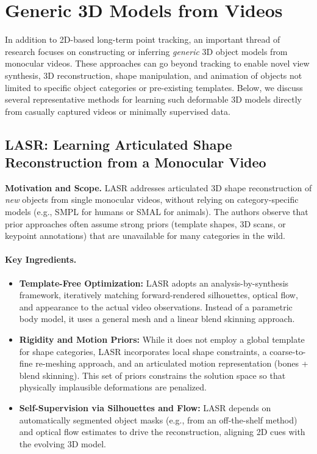 \documentclass[11pt]{article}
\begin{document}
\section{Generic 3D Models from Videos}
\label{sec:generic_3d_models}

In addition to 2D-based long-term point tracking, an important thread of research focuses on constructing or inferring \emph{generic} 3D object models from monocular videos. These approaches can go beyond tracking to enable novel view synthesis, 3D reconstruction, shape manipulation, and animation of objects not limited to specific object categories or pre-existing templates. Below, we discuss several representative methods for learning such deformable 3D models directly from casually captured videos or minimally supervised data.

\subsection{LASR: Learning Articulated Shape Reconstruction from a Monocular Video~\cite{yang2021lasr}}
\textbf{Motivation and Scope.} 
LASR addresses articulated 3D shape reconstruction of \emph{new} objects from single monocular videos, without relying on category-specific models (e.g., SMPL for humans or SMAL for animals). The authors observe that prior approaches often assume strong priors (template shapes, 3D scans, or keypoint annotations) that are unavailable for many categories in the wild. 

\paragraph{Key Ingredients.}
\begin{itemize}
    \item \textbf{Template-Free Optimization:} LASR adopts an analysis-by-synthesis framework, iteratively matching forward-rendered silhouettes, optical flow, and appearance to the actual video observations. Instead of a parametric body model, it uses a general mesh and a linear blend skinning approach.
    \item \textbf{Rigidity and Motion Priors:} While it does not employ a global template for shape categories, LASR incorporates local shape constraints, a coarse-to-fine re-meshing approach, and an articulated motion representation (bones + blend skinning). This set of priors constrains the solution space so that physically implausible deformations are penalized.
    \item \textbf{Self-Supervision via Silhouettes and Flow:} LASR depends on automatically segmented object masks (e.g., from an off-the-shelf method) and optical flow estimates to drive the reconstruction, aligning 2D cues with the evolving 3D model.
\end{itemize}
\end{document}
